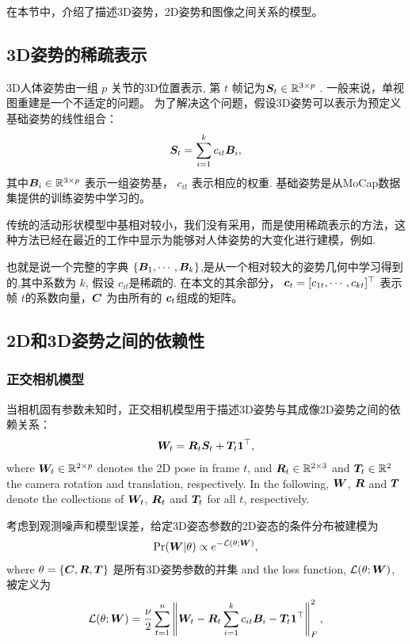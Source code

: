 在本节中，介绍了描述3D姿势，2D姿势和图像之间关系的模型。
\subsection{3D姿势的稀疏表示}
3D人体姿势由一组 $p$ 关节的3D位置表示, 第 $t$ 帧记为${\bm{S}}_t\in\mathbb{R}^{3 \times p}$ .
一般来说，单视图重建是一个不适定的问题。 为了解决这个问题，假设3D姿势可以表示为预定义基础姿势的线性组合：
\begin{align}\label{eq:shape-model}
    {\bm{S}}_t = \sum_{i=1}^{k} c_{it}{\bm{B}}_i,
\end{align}
其中${\bm{B}}_i\in\mathbb{R}^{3 \times p}$ 表示一组姿势基， $c_{it}$ 表示相应的权重. 基础姿势是从MoCap数据集提供的训练姿势中学习的。

传统的活动形状模型\cite{cootes1995}中基相对较小，我们没有采用，而是使用稀疏表示的方法，这种方法已经在最近的工作中显示为能够对人体姿势的大变化进行建模，例如\cite{ramakrishna2012reconstructing,akhter2015pose,zhou2015sparse}.

也就是说一个完整的字典 $\{{\bm{B}}_1,\cdots,{\bm{B}}_k\}$,是从一个相对较大的姿势几何中学习得到的,其中系数为 $k$, 假设 $c_{it}$是稀疏的. 在本文的其余部分，
${\bm{c}}_t = [c_{1t},\cdots,c_{kt}]^\top$ 表示帧 $t$的系数向量，${\bm{C}}$ 为由所有的 ${\bm{c}}_{t}$组成的矩阵。


\subsection{2D和3D姿势之间的依赖性}

\subsubsection{正交相机模型}

当相机固有参数未知时，正交相机模型用于描述3D姿势与其成像2D姿势之间的依赖关系：
\begin{align}\label{eq:camera-model}
    {\bm{W}}_t = {\bm{R}}_t{\bm{S}}_t + {\bm{T}}_t{\bm{1}}^\top,
\end{align}
where ${\bm{W}}_t\in\mathbb{R}^{2 \times p}$ denotes the 2D pose in frame $t$, and ${\bm{R}}_t\in\mathbb{R}^{2 \times 3}$ and ${\bm{T}}_t\in\mathbb{R}^{2}$ the camera rotation and translation, respectively. In the following, ${\bm{W}}$, ${\bm{R}}$ and ${\bm{T}}$ denote the collections of ${\bm{W}}_t$, ${\bm{R}}_t$ and ${\bm{T}}_t$ for all $t$, respectively.

考虑到观测噪声和模型误差，给定3D姿态参数的2D姿态的条件分布被建模为
\begin{align}\label{eq:likelihood}
\mbox{Pr}({\bm{W}}|\theta) \propto e^{-\mathcal{L}(\theta;{\bm{W}})},
\end{align}
where $\theta=\{{\bm{C}},{\bm{R}},{\bm{T}}\}$ 是所有3D姿势参数的并集
and the loss function, $\mathcal{L}(\theta;{\bm{W}})$, 被定义为
\begin{align}\label{eq:loss}
\mathcal{L}(\theta;{\bm{W}}) = \frac{\nu}{2}\sum_{t=1}^{n}\left\|{\bm{W}}_t - {\bm{R}}_t\sum_{i=1}^{k} c_{it}{\bm{B}}_i - {\bm{T}}_t{\bm{1}}^\top\right\|_F^2,
\end{align}

